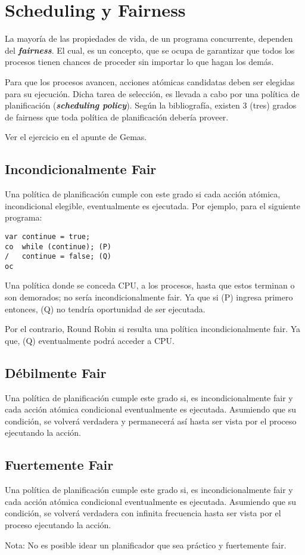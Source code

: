 \documentclass[a4paper, 10pt]{report}
\begin{document}
\section{Scheduling y Fairness}

La mayoría de las propiedades de vida, de un programa concurrente, dependen del \textbf{\emph{fairness}}. El cual, es un concepto, que se ocupa de garantizar que todos los procesos tienen chances de proceder sin importar lo que hagan los demás.

Para que los procesos avancen, acciones atómicas candidatas deben ser elegidas para su ejecución. Dicha tarea de selección, es llevada a cabo por una política de planificación (\textbf{\emph{scheduling policy}}). Según la bibliografía, existen 3 (tres) grados de fairness que toda política de planificación debería proveer.

\begin{basic_box}
     Ver el ejercicio en el apunte de Gemas.
\end{basic_box}

\subsection{Incondicionalmente Fair}

Una política de planificación cumple con este grado si cada acción atómica, incondicional elegible, eventualmente es ejecutada. Por ejemplo, para el siguiente programa:

\begin{lstlisting}
var continue = true;
co  while (continue); (P)
/   continue = false; (Q)
oc
\end{lstlisting}


Una política donde se conceda CPU, a los procesos, hasta que estos terminan o son demorados; no sería incondicionalmente fair. Ya que si (P) ingresa primero entonces, (Q) no tendría oportunidad de ser ejecutada.

Por el contrario, Round Robin si resulta una política incondicionalmente fair. Ya que, (Q) eventualmente podrá acceder a CPU.

\subsection{Débilmente Fair}

Una política de planificación cumple este grado si, es incondicionalmente fair y cada acción atómica condicional eventualmente es ejecutada. Asumiendo que su condición, se volverá verdadera y permanecerá así hasta ser vista por el proceso ejecutando la acción.

\subsection{Fuertemente Fair}

Una política de planificación cumple este grado si, es incondicionalmente fair y cada acción atómica condicional eventualmente es ejecutada. Asumiendo que su condición, se volverá verdadera con infinita frecuencia hasta ser vista por el proceso ejecutando la acción.

Nota: No es posible idear un planificador que sea práctico y fuertemente fair.
\end{document}
